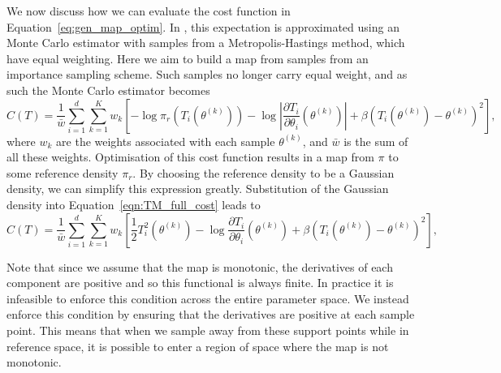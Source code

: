 \documentclass[final]{siamltex}
\newcommand{\edit}[1]{{\color{red} #1}}
\begin{document}
\edit{We now discuss how we can evaluate the cost function in
Equation~\eqref{eq:gen_map_optim}. In \cite{parno2018transport}, this
expectation is approximated using an Monte Carlo estimator with samples from
a Metropolis-Hastings method, which have equal weighting.
Here we aim to build a map from
samples from an importance sampling scheme.} Such samples no longer
carry equal weight, and as such the Monte Carlo estimator becomes
\begin{equation}\label{eqn:TM_full_cost}
	C(T) = \frac{1}{\bar{w}}\sum\limits_{i=1}^d \! \sum\limits_{k=1}^K
		w_k \left[-\log\pi_r(T_i(\theta^{(k)})) -
			\log\left|\frac{\partial T_i}{\partial \theta_i}(\theta^{(k)})\right| + \beta(T_i(\theta^{(k)})-\theta^{(k)})^2\right],
\end{equation}
where $w_k$ are the weights associated with each sample $\theta^{(k)}$, and $\bar{w}$ is the sum of
all these weights. Optimisation of this cost function results in a map from $\pi$ to some reference density $\pi_r$. By choosing the reference density to be a Gaussian density, we can simplify this expression greatly. Substitution of the Gaussian density into Equation~\eqref{eqn:TM_full_cost} leads to
\begin{equation}\label{eqn:TETAIS_objective}
	C(T) = \frac{1}{\bar{w}}\sum\limits_{i=1}^d \! \sum\limits_{k=1}^K
		w_k\left[\frac{1}{2}T_i^2(\theta^{(k)}) - \log\frac{\partial
		T_i}{\partial\theta_i}(\theta^{(k)}) + \beta(T_i(\theta^{(k)})-\theta^{(k)})^2\right],
\end{equation}

Note that since we assume that the map is monotonic, the derivatives of each component are
positive and so this functional is always finite. In practice it is infeasible to enforce this condition across the entire parameter space. We instead enforce this condition by ensuring that the derivatives are positive at each sample point. This means that when we sample away from these support points while in reference space, it is possible to enter a region of space where the map is not monotonic.
\end{document}
